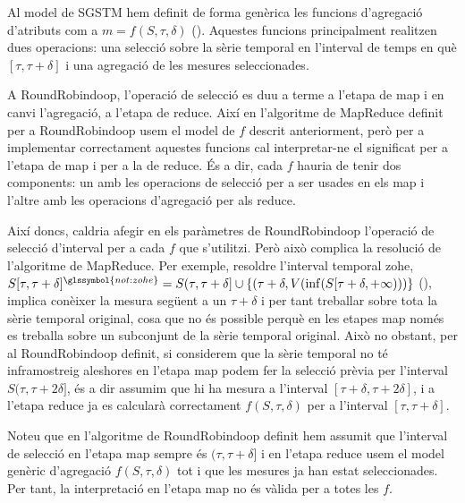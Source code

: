 Al model de \gls{SGSTM} hem definit de forma genèrica les funcions
d'agregació d'atributs com a $m=f(S,\tau,\delta)$
(). Aquestes funcions principalment
realitzen dues operacions: una selecció sobre la sèrie temporal en
l'interval de temps en què $[\tau,\tau+\delta]$ i una agregació de les
mesures seleccionades.

A RoundRobindoop, l'operació de selecció es duu a terme a l'etapa de
map i en canvi l'agregació, a l'etapa de reduce.  Així en l'algoritme
de MapReduce definit per a RoundRobindoop usem el model de $f$ descrit
anteriorment, però per a implementar correctament aquestes funcions
cal interpretar-ne el significat per a l'etapa de map i per a la de
reduce. És a dir, cada $f$ hauria de tenir dos components: un amb les
operacions de selecció per a ser usades en els map i l'altre amb les
operacions d'agregació per als reduce.


Així doncs, caldria afegir en els paràmetres de RoundRobindoop
l'operació de selecció d'interval per a cada $f$ que s'utilitzi. Però
això complica la resolució de l'algoritme de MapReduce. Per exemple,
resoldre l'interval temporal \gls{zohe},
$S[\tau,\tau+\delta]^{\glssymbol{not:zohe}} = S(\tau,\tau+\delta] \cup
\{ (\tau+\delta,V(\inf(S[\tau+\delta,+\infty))) \}$
(), implica conèixer la mesura següent a un
$\tau+\delta$ i per tant treballar sobre tota la sèrie temporal
original, cosa que no és possible perquè en les etapes map només es
treballa sobre un subconjunt de la sèrie temporal original. Això no
obstant, per al RoundRobindoop definit, si considerem que la sèrie
temporal no té inframostreig aleshores en l'etapa map podem fer la
selecció prèvia per l'interval $S(\tau,\tau+2\delta]$, és a dir
assumim que hi ha mesura a l'interval $[\tau+\delta,\tau+2\delta]$, i
a l'etapa reduce ja es calcularà correctament $f(S,\tau,\delta)$ per a
l'interval $[\tau,\tau+\delta]$.


Noteu que en l'algoritme de RoundRobindoop definit hem assumit que
l'interval de selecció en l'etapa map sempre és $(\tau,\tau+\delta]$ i
en l'etapa reduce usem el model genèric d'agregació $f(S,\tau,\delta)$
tot i que les mesures ja han estat seleccionades. Per tant, la
interpretació en l'etapa map no és vàlida per a totes les $f$.

